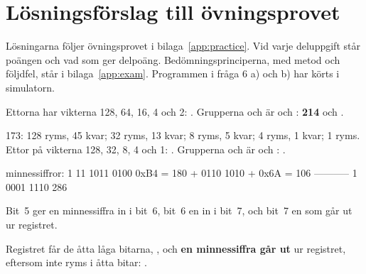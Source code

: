 %

\renewcommand{\answerprefix}{pans}

\chapter{Lösningsförslag till övningsprovet}
\label{app:practice:answers}

Lösningarna följer övningsprovet i bilaga~\ref{app:practice}. Vid varje deluppgift står poängen och
vad som ger delpoäng. Bedömningsprinciperna, med metod och följdfel, står i bilaga~\ref{app:exam}.
Programmen i fråga 6 a) och b) har körts i simulatorn.


Ettorna har vikterna 128, 64, 16, 4 och 2: . Grupperna 
och  är  och : \textbf{214} och \textbf{}.

173: 128 ryms, 45 kvar; 32 ryms, 13 kvar; 8 ryms, 5 kvar; 4 ryms, 1 kvar; 1 ryms. Ettor på vikterna
128, 32, 8, 4 och 1: \textbf{}. Grupperna  och  är 
och : \textbf{}.

\begin{textdrawing}
  minnessiffror: 1 11
                   1011 0100      0xB4 = 180
                 + 0110 1010    + 0x6A = 106
                 -----------
                 1 0001 1110      286
\end{textdrawing}

\noindent Bit~5 ger en minnessiffra in i bit~6, bit~6 en in i bit~7, och bit~7 en som går ut ur
registret.

Registret får de åtta låga bitarna, \textbf{}, och \textbf{en minnessiffra går ut} ur
registret, eftersom  inte ryms i åtta bitar: .

